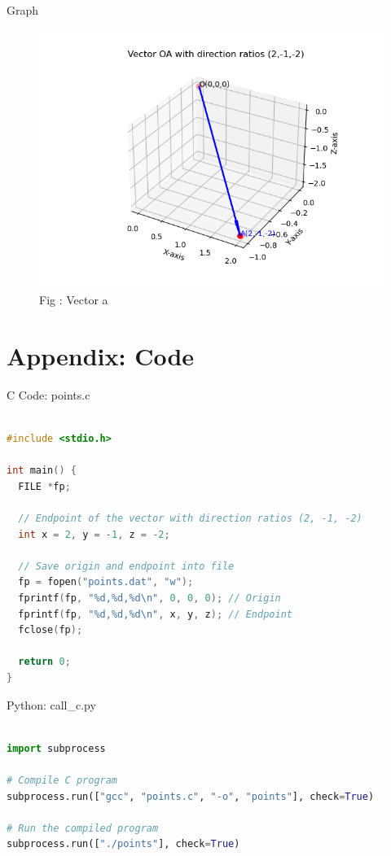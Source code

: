 \documentclass{beamer}
\numberwithin{equation}{section}
\theoremstyle{remark}
\begin{document}
\begin{frame}{Graph}
\begin{figure}[h!]
  \centering
  \includegraphics[width=0.8\columnwidth]{figs/fig_vector.png} 
   \caption*{Fig : Vector a}
  \label{Fig1}
\end{figure}

\end{frame}

\section*{Appendix: Code}

\begin{frame}[fragile]{C Code: points.c}
\begin{lstlisting}[language=C]

#include <stdio.h>

int main() {
  FILE *fp;

  // Endpoint of the vector with direction ratios (2, -1, -2)
  int x = 2, y = -1, z = -2;

  // Save origin and endpoint into file
  fp = fopen("points.dat", "w");
  fprintf(fp, "%d,%d,%d\n", 0, 0, 0); // Origin
  fprintf(fp, "%d,%d,%d\n", x, y, z); // Endpoint
  fclose(fp);

  return 0;
}

\end{lstlisting}
\end{frame}

\begin{frame}[fragile]{Python: call\_c.py}
\begin{lstlisting}[language=Python]

import subprocess

# Compile C program
subprocess.run(["gcc", "points.c", "-o", "points"], check=True)

# Run the compiled program
subprocess.run(["./points"], check=True)

\end{lstlisting}
\end{frame}
\end{document}

